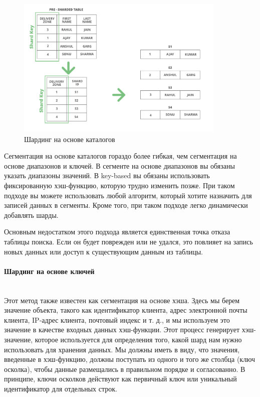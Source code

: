 \begin{figure}[H]
    \centering
    \includegraphics[width=100mm]{assets/distributed/Directory-Based-Sharding}
    \caption{Шардинг на основе каталогов}
    \label{fig:Directory-Based-Sharding}
\end{figure}

Сегментация на основе каталогов гораздо более гибкая, чем сегментация на основе диапазонов и ключей. В сегменте на
основе диапазонов вы обязаны указать диапазоны значений. В key-based вы обязаны использовать фиксированную хэш-функцию,
которую трудно изменить позже. При таком подходе вы можете использовать любой алгоритм, который хотите назначить для
записей данных в сегменты. Кроме того, при таком подходе легко динамически добавлять шарды.

Основным недостатком этого подхода является единственная точка отказа таблицы поиска. Если он будет поврежден или не
удался, это повлияет на запись новых данных или доступ к существующим данным из таблицы. \autocite{DatabaseSharding}

\paragraph{Шардинг на основе ключей} ~\\
Этот метод также известен как сегментация на основе хэша. Здесь мы берем значение объекта, такого как идентификатор
клиента, адрес электронной почты клиента, IP-адрес клиента, почтовый индекс и т. д., и мы используем это значение в
качестве входных данных хэш-функции. Этот процесс генерирует хэш-значение, которое используется для определения того,
какой шард нам нужно использовать для хранения данных. Мы должны иметь в виду, что значения, введенные в хэш-функцию,
должны поступать из одного и того же столбца (ключ осколка), чтобы данные размещались в правильном порядке и
согласованно. В принципе, ключи осколков действуют как первичный ключ или уникальный идентификатор для отдельных строк.


